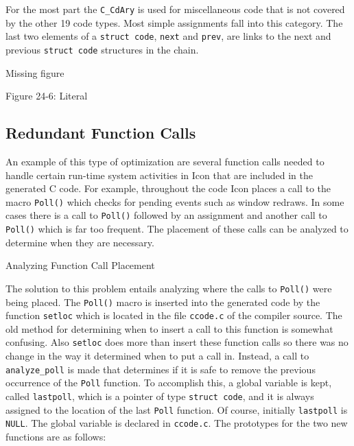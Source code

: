 For the most part the \texttt{C\_CdAry} is used for miscellaneous code
that is not covered by the other 19 code types. Most simple
assignments fall into this category. The last two elements of a
\texttt{struct code}, \texttt{next} and \texttt{prev}, are links to
the next and previous \texttt{struct code} structures in the chain.


\bigskip

\begin{center}{\color{red} Missing figure}\end{center}
\bigskip

{\centering{}
Figure 24-6: Literal
\par}

\subsection{Redundant Function Calls}

An example of this type of optimization are several function calls
needed to handle certain run-time system activities in Icon that are
included in the generated C code. For example, throughout the code
Icon places a call to the macro \texttt{Poll()} which checks for
pending events such as window redraws. In some cases there is a call
to \texttt{Poll()} followed by an assignment and another call to
\texttt{Poll()} which is far too frequent. The placement of these
calls can be analyzed to determine when they are necessary.

{\sffamily
Analyzing Function Call Placement}

The solution to this problem entails analyzing where the calls to
\texttt{Poll()} were being placed. The \texttt{Poll()} macro is
inserted into the generated code by the function \texttt{setloc} which
is located in the file \texttt{ccode.c} of the compiler source. The
old method for determining when to insert a call to this function is
somewhat confusing. Also \texttt{setloc} does more than insert these
function calls so there was no change in the way it determined when to
put a call in. Instead, a call to \texttt{analyze\_poll} is made that
determines if it is safe to remove the previous occurrence of the
\texttt{Poll} function. To accomplish this, a global variable is kept,
called \texttt{lastpoll}, which is a pointer of type \texttt{struct
code}, and it is always assigned to the location of the last
\texttt{Poll} function. Of course, initially \texttt{lastpoll} is
\texttt{NULL}. The global variable is declared in
\texttt{ccode.c}. The prototypes for the two new functions are as
follows:

